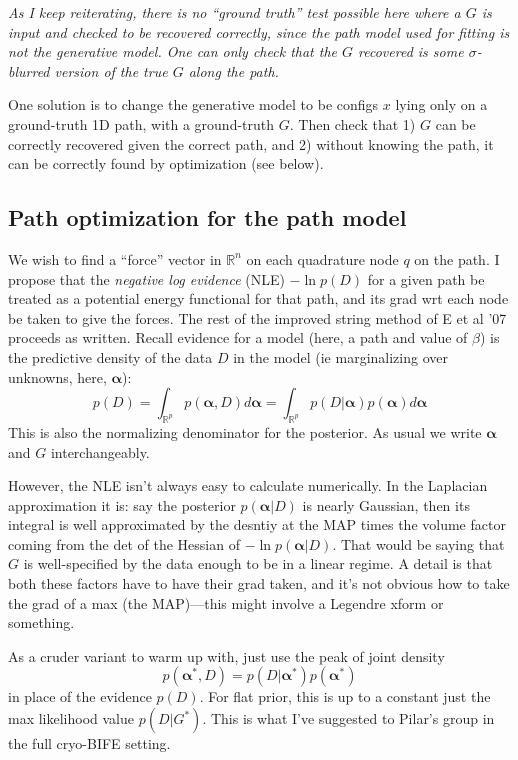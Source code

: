 \documentclass[10pt]{article}
\newcommand{\be}{\begin{equation}}
\newcommand{\ee}{\end{equation}}
\newcommand{\R}{\mathbb{R}}
\newcommand{\bt}{\beta}
\newcommand{\bal}{{\bm\alpha}}
\begin{document}
{\em 
As I keep reiterating, there is no ``ground truth'' test possible here
where a $G$ is input and checked to be recovered correctly,
since the path model used for fitting is not the generative model.
One can only check that the $G$ recovered is some $\sigma$-blurred version
of the true $G$ along the path.
}

One solution is to change the generative model to be configs $x$ lying
only on a ground-truth 1D path, with a ground-truth $G$.
Then check that 1) $G$ can be correctly recovered given the correct path,
and 2) without knowing the path, it can be correctly found by optimization
(see below).


\subsection{Path optimization for the path model}

We wish to find a ``force'' vector in $\R^n$ on each quadrature node $q$ on the path.
I propose that the {\em negative log evidence} (NLE) $-\ln p(D)$ for a given
path be treated as a potential energy functional for that path,
and its grad wrt each node be taken to give the forces.
The rest of the improved string method of E et al '07 proceeds as written.
Recall evidence for a model (here, a path and value of $\bt$) is
the predictive density of the data $D$ in the model (ie marginalizing over unknowns, here, $\bal$):
\be
p(D) = \int_{\R^p} p(\bal,D) d\bal = \int_{\R^p} p(D|\bal) p(\bal) d\bal
\ee
This is also the normalizing denominator for the posterior.
As usual we write $\bal$ and $G$ interchangeably.

However, the NLE isn't always easy to calculate numerically.
In the Laplacian approximation it is: say the posterior $p(\bal|D)$ is
nearly Gaussian, then its integral is well approximated by the
desntiy at the MAP times the volume factor coming from the det of the
Hessian of $-\ln p(\bal|D)$.
That would be saying that $G$ is well-specified by the data enough to
be in a linear regime.
A detail is that both these factors have to have their grad taken,
and it's not obvious how to take the grad of a max (the MAP)---this might
involve a Legendre xform or something.

As a cruder variant to warm up with, just use the peak of joint density
$$
p(\bal^\ast,D) = p(D|\bal^\ast) p(\bal^\ast)
$$
in place of the evidence $p(D)$.
For flat prior, this is up to a constant
just the max likelihood value $p(D|G^\ast)$.
This is what I've suggested to Pilar's group in the full cryo-BIFE setting.
\end{document}
